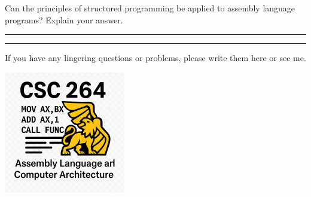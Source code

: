 \documentclass[letterpaper,12pt]{exam}
\begin{document}
\begin{questions}
\begin{samepage}
    \question Can the principles of structured programming be applied to assembly language programs? Explain your answer.
    \vspace{5mm}
\end{samepage}
\par
 
\rule{0.5\textwidth}{.4pt} %
\end{questions} 
\begin{center}
    \rule{0.667\textwidth}{.8pt} %
\end{center}


If you have any lingering questions or problems, please write them here or see me.
\vfill
\begin{center}
\includegraphics{../csc264Logo}
\end{center}
\end{document}
